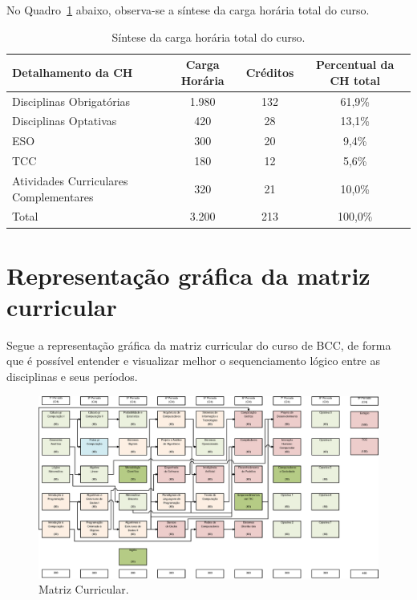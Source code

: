 \documentclass[
	12pt,				%
	openright,			%
  oneside,     %
	a4paper,			%
	chapter=TITLE,		%
	english,			%
	french,				%
	spanish,			%
	brazil				%
	]{abntex2}
\begin{document}
  No Quadro~\ref{quadro:sintese-carga-horaria-total-do-curso} abaixo, observa-se a síntese da carga horária total do curso.
  
  
  \begin{center}
    
    \begin{tiny}
      \begin{longtable}{lccc}
        \caption{\label{quadro:sintese-carga-horaria-total-do-curso}Síntese da carga horária total do curso.}\\
      \toprule
      \textbf{Detalhamento da CH} & \textbf{Carga Horária} & \textbf{Créditos} & \textbf{Percentual da CH total}\\
      \midrule
      Disciplinas Obrigatórias & 1.980 & 132 & 61,9\% \\ \midrule
      Disciplinas Optativas & 420 & 28 & 13,1\% \\ \midrule
      ESO & 300 & 20 & 9,4\% \\ \midrule
      TCC & 180 & 12 & 5,6\% \\ \midrule
      Atividades Curriculares Complementares & 320 & 21 & 10,0\% \\ \midrule
      Total & 3.200 & 213 & 100,0\% \\
  \bottomrule
  \end{longtable}
  \end{tiny}      
  \end{center}
  
  \section{Representação gráfica da matriz curricular}
  
  Segue a representação gráfica da matriz curricular do curso de BCC, de forma que é possível entender e visualizar melhor o sequenciamento lógico entre as disciplinas e seus períodos.
  
  \begin{figure}[!htb]
    \centering
    \caption{\label{fig:matriz-curricular}Matriz Curricular.}
    
    \includegraphics[width=\textwidth]{./images/matriz6.eps}
  \end{figure}
  
\end{document}
